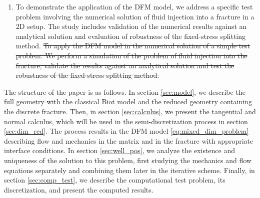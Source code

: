 \documentclass[a4paper]{article}
\numberwithin{equation}{section}
\def\js#1{{\color{blue}#1}}
\begin{document}
\begin{enumerate}
    \item \js{
To demonstrate the application of the DFM model, we address a specific test problem involving the numerical solution of fluid injection into a fracture in a 2D setup. The study includes validation of the numerical results against an analytical solution and evaluation of robustness of the fixed-stress splitting method.
\sout{To apply the DFM model in the numerical solution of a simple test problem.
We perform a simulation of the problem of fluid injection into the fracture, validate the results against an analytical solution and test the robustness of the fixed-stress splitting method.}}

\end{enumerate}

The structure of the paper is as follows.
In section \ref{sec:model}, we describe the full geometry with the classical Biot model and the reduced geometry containing the discrete fracture.
Then, in section \ref{sec:calculus}, we present the tangential and normal calculus, which will be used in the semi-discretization process in section \ref{sec:dim_red}.
The process results in the DFM model \eqref{eq:mixed_dim_problem} describing flow and mechanics in the matrix and in the fracture with appropriate interface conditions.
In section \ref{sec:well_pos}, we analyze the existence and uniqueness of the solution to this problem, first studying the mechanics and flow equations separately and combining them later in the iterative scheme.
Finally, in section \ref{sec:comp_test}, we describe the computational test problem, its discretization, and present the computed results.
\end{document}
